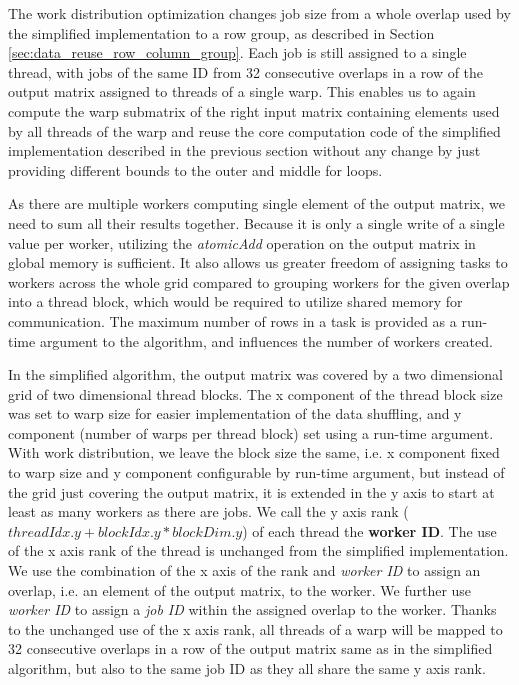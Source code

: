 The work distribution optimization changes job size from a whole overlap used by the simplified implementation to a row group, as described in Section \ref{sec:data_reuse_row_column_group}. Each job is still assigned to a single thread, with jobs of the same ID from 32 consecutive overlaps in a row of the output matrix assigned to threads of a single warp. This enables us to again compute the warp submatrix of the right input matrix containing elements used by all threads of the warp and reuse the core computation code of the simplified implementation described in the previous section without any change by just providing different bounds to the outer and middle for loops. 

As there are multiple workers computing single element of the output matrix, we need to sum all their results together. Because it is only a single write of a single value per worker, utilizing the \textit{atomicAdd} operation on the output matrix in global memory is sufficient. It also allows us greater freedom of assigning tasks to workers across the whole grid compared to grouping workers for the given overlap into a thread block, which would be required to utilize shared memory for communication. The maximum number of rows in a task is provided as a run-time argument to the algorithm, and influences the number of workers created.


In the simplified algorithm, the output matrix was covered by a two dimensional grid of two dimensional thread blocks. The x component of the thread block size was set to warp size for easier implementation of the data shuffling, and y component (number of warps per thread block) set using a run-time argument. With work distribution, we leave the block size the same, i.e. x component fixed to warp size and y component configurable by run-time argument, but instead of the grid just covering the output matrix, it is extended in the y axis to start at least as many workers as there are jobs. We call the y axis rank ($threadIdx.y + blockIdx.y * blockDim.y$) of each thread the \textbf{worker ID}. The use of the x axis rank of the thread is unchanged from the simplified implementation. We use the combination of the x axis of the rank and \textit{worker ID} to assign an overlap, i.e. an element of the output matrix, to the worker. We further use \textit{worker ID} to assign a \textit{job ID} within the assigned overlap to the worker. Thanks to the unchanged use of the x axis rank, all threads of a warp will be mapped to 32 consecutive overlaps in a row of the output matrix same as in the simplified algorithm, but also to the same job ID as they all share the same y axis rank.

